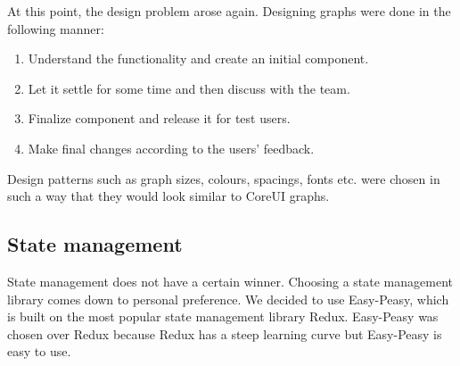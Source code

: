 At this point, the design problem arose again.
Designing graphs were done in the following manner:
\begin{enumerate}
    \item Understand the functionality and create an initial component.
    \item Let it settle for some time and then discuss with the team.
    \item Finalize component and release it for test users.
    \item Make final changes according to the users' feedback.
\end{enumerate}
Design patterns such as graph sizes, colours, spacings, fonts etc. were chosen in such a way that they would look similar to CoreUI graphs.

\subsection{State management}\label{subsec:state-management}
State management does not have a certain winner.
Choosing a state management library comes down to personal preference.
We decided to use Easy-Peasy, which is built on the most popular state management library Redux.
Easy-Peasy was chosen over Redux because Redux has a steep learning curve but Easy-Peasy is easy to use.
